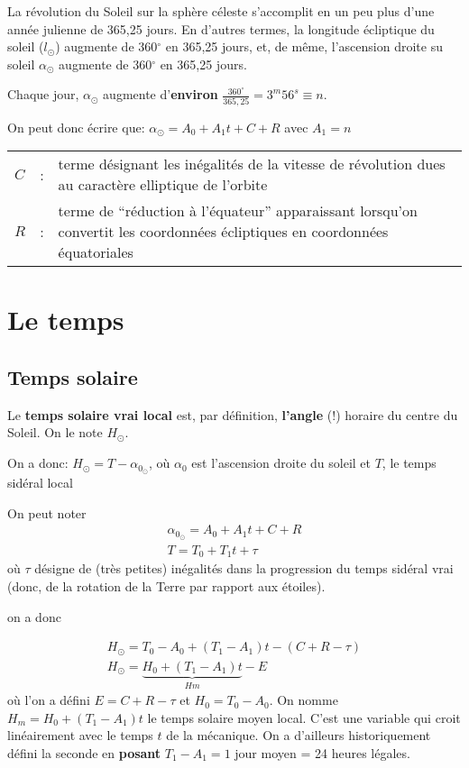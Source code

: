 \documentclass[12pt]{report}
\def\sun{\odot}
\begin{document}
La révolution du Soleil sur la sphère céleste s'accomplit en un peu plus d'une année julienne de 365,25 jours. En d'autres termes, la longitude écliptique du soleil ($l_\sun$) augmente de 360$^\circ$ en 365,25 jours, et, de même, l'ascension droite su soleil $\alpha_\sun$ augmente de 360$^\circ$ en 365,25 jours. 

Chaque jour, $\alpha_\sun$ augmente d'\textbf{environ} $\frac{360^\circ}{365,25}=3^m56^s \equiv n$. 

On peut donc écrire que: $\alpha_{\odot} = A_0 + A_1 t + C + R$ avec $A_1=n$

\begin{tabular}{llp{15cm}}
$C$ &:& terme désignant les inégalités de la vitesse de révolution dues au caractère elliptique de l'orbite  \\
$R$ &:& {terme de ``réduction à l'équateur'' apparaissant lorsqu'on convertit les coordonnées écliptiques en coordonnées équatoriales}
\end{tabular}

\chapter{Le temps}
\section{Temps solaire}
Le \textbf{temps solaire vrai local} est, par définition, \textbf{l'angle} (!) horaire du centre du Soleil. On le note $H_\sun$. 

On a donc: $H_{\odot} = T-\alpha_{0_\odot}$, où $\alpha_0$ est l'ascension droite du soleil et $T$, le temps sidéral local


On peut noter
$$
\begin{array}{llll}
\alpha_{0_\odot} = A_0 + A_1 t + C + R \\
T = T_0 + T_1 t + \tau
\end{array}
$$
où $\tau$ désigne de (très petites) inégalités dans la progression du temps sidéral vrai (donc, de la rotation de la Terre par rapport aux étoiles). 


on a donc

$$
\begin{array}{llll}
H_\odot = T_0-A_0 + (T_1-A_1) t - (C+R-\tau)\\
H_\odot = \underbrace{H_0+(T_1-A_1) t}_{Hm} - E
\end{array}
$$
où l'on a défini $E=C+R-\tau$ et $H_0=T_0-A_0$. 
On nomme $H_m=H_0+(T_1-A_1) t$ le temps solaire moyen local. C'est une variable qui croit linéairement avec le temps $t$ de la mécanique. On a d'ailleurs historiquement d\'efini la seconde en \textbf{posant} $T_1-A_1=1$ jour moyen  = 24 heures légales. 
\end{document}

